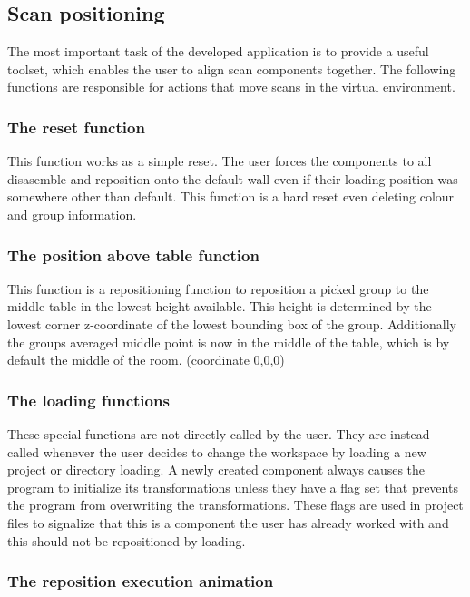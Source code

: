 \documentclass[hyperref,english,bachelorofscience,bibnum,twoside]{cgvpub}
\begin{document}
\subsection{Scan positioning}

The most important task of the developed application is to provide a useful toolset, which enables the user to align scan components together. The following functions are responsible for actions that move scans in the virtual environment.

\subsubsection{The reset function}

This function works as a simple reset. The user forces the components to all disasemble and reposition onto the default wall even if their loading position was somewhere other than default. This function is a hard reset even deleting colour and group information.

\subsubsection{The position above table function}

This function is a repositioning function to reposition a picked group to the middle table in the lowest height available. This height is determined by the lowest corner z-coordinate of the lowest bounding box of the group. Additionally the groups averaged middle point is now in the middle of the table, which is by default the middle of the room. (coordinate 0,0,0)

\subsubsection{The loading functions}

These special functions are not directly called by the user. They are instead called whenever the user decides to change the workspace by loading a new project or directory loading. A newly created component always causes the program to initialize its transformations unless they have a flag set that prevents the program from overwriting the transformations. These flags are used in project files to signalize that this is a component the user has already worked with and this should not be repositioned by loading. 

\subsubsection{The reposition execution animation}
\end{document}
